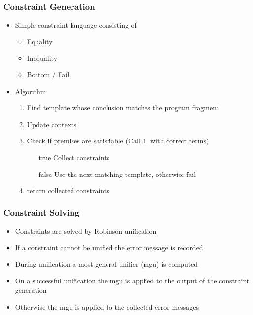 \documentclass{beamer}
\begin{document}
\begin{frame}
  \frametitle{Constraint Generation}
  \begin{itemize}
  \item Simple constraint language consisting of
    \begin{itemize}
    \item Equality
    \item Inequality
    \item Bottom / Fail
    \end{itemize}
  \item Algorithm
    \begin{enumerate}
    \item Find template whose conclusion matches the program fragment
    \item Update contexts
    \item Check if premises are satisfiable (Call 1. with correct
      terms)
      \begin{itemize}
      \item[true] Collect constraints
      \item[false] Use the next matching template, otherwise fail
      \end{itemize}
    \item return collected constraints
    \end{enumerate}
  \end{itemize}
\end{frame}

\begin{frame}
  \frametitle{Constraint Solving}
  \begin{itemize}
  \item Constraints are solved by Robinson unification
  \item If a constraint cannot be unified the error message is recorded
  \item During unification a most general unifier (mgu) is computed
  \item On a successful unification the mgu is applied to the output
    of the constraint generation
  \item Otherwise the mgu is applied to the collected error messages
  \end{itemize}
\end{frame}
\end{document}
